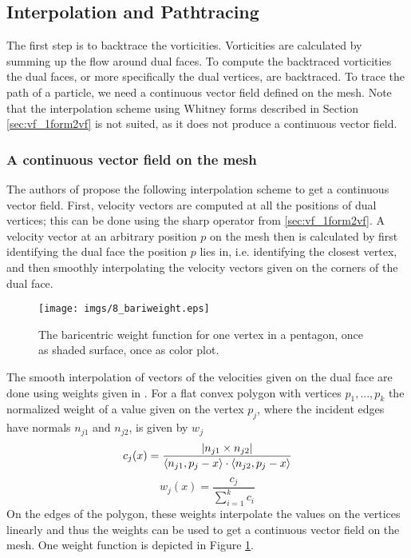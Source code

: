 \subsection{Interpolation and Pathtracing}
\label{ssec:fd_interpolation_and_PT}
The first step is to backtrace the vorticities. Vorticities are calculated by summing up the flow around dual faces. To compute the backtraced vorticities the dual faces, or more specifically the dual vertices, are backtraced. To trace the path of a particle, we need a continuous vector field defined on the mesh. Note that the interpolation scheme using Whitney forms described in Section \ref{sec:vf_1form2vf} is not suited, as it does not produce a continuous vector field. 

\subsubsection{A continuous vector field on the mesh}
The authors of \cite{simplicialFluids} propose the following interpolation scheme to get a  continuous vector field. First, velocity vectors are computed at all the positions of dual vertices; this can be done using the sharp operator from \ref{sec:vf_1form2vf}. A velocity vector at an arbitrary position $p$ on the mesh then is calculated by first identifying the dual face the position $p$ lies in, i.e. identifying the closest vertex,  and then smoothly interpolating the velocity vectors given on the corners of the dual face.

\begin{figure}%
\begin{center}
\texttt{[image: imgs/8\_bariweight.eps]}%
\end{center}
\caption{The baricentric weight function for one vertex in a pentagon, once as shaded surface, once as color plot.}%
\label{fig:fd_bariweight}%
\end{figure}

The smooth interpolation of vectors of the velocities given on the dual face are done using weights given in \cite{citeulike:2398873}. For a flat convex polygon with vertices $p_1,...,p_k$ the normalized  weight of a value given on the vertex $p_j$, where the incident edges have normals $n_{j1}$ and $n_{j2}$, is given by $w_j$
\[c_j(x) = \frac{\left| n_{j1} \times n_{j2} \right|}{\langle n_{j1}, p_j -x\rangle\cdot\langle n_{j2}, p_j -x\rangle}\]
\[w_j(x) = \frac{c_j}{\sum_{i=1}^k c_i}\]
On the edges of the polygon, these weights interpolate the values on the vertices linearly and thus the weights can be used to get a continuous vector field on the mesh. One weight function is depicted in Figure \ref{fig:fd_bariweight}.

